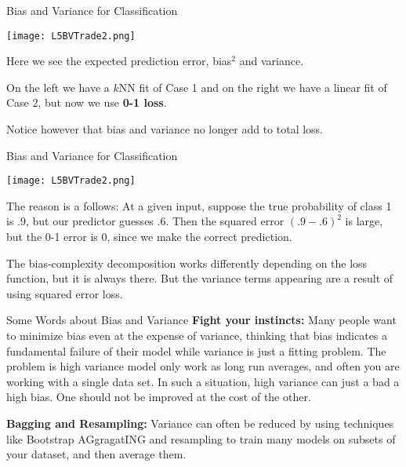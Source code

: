 \documentclass[10pt, table, dvipsnames,handout]{beamer}
\begin{document}
\begin{frame}[fragile]{Bias and Variance for Classification}
  \begin{minipage}[t][0.5\textheight][t]{\textwidth}
	  \centering \texttt{[image: L5BVTrade2.png]}
  \end{minipage}
  \vfill
  \begin{minipage}[t][0.5\textheight][t]{\textwidth}
Here we see the {\color{orange}expected prediction error}, {\color{ForestGreen}bias$^2$} and {\color{SkyBlue}variance}.\newline

On the left we have a $k$NN fit of Case 1 and on the right we have a linear fit of Case 2, but now we use \textbf{0-1 loss}. \newline

Notice however that bias and variance no longer add to total loss.  


\end{minipage}
\end{frame}



\begin{frame}[fragile]{Bias and Variance for Classification}
  \begin{minipage}[t][0.5\textheight][t]{\textwidth}
	  \centering \texttt{[image: L5BVTrade2.png]}
  \end{minipage}
  \vfill
  \begin{minipage}[t][0.5\textheight][t]{\textwidth}
The reason is a follows: At a given input, suppose the true probability of class 1 is .9, but our predictor guesses .6. Then the squared error $(.9-.6)^2$ is large, but the 0-1 error is 0, since we make the correct prediction. \pause\newline

The bias-complexity decomposition works differently depending on the loss function, but it is always there. \pause But the variance terms appearing are a result of using squared error loss. 

\end{minipage}
\end{frame}




\begin{frame}[fragile]{Some Words about Bias and Variance}
\textbf{Fight your instincts:} Many people want to minimize bias even at the expense of variance, thinking that bias indicates a fundamental failure of their model while variance is just a fitting problem. The problem is high variance model only work as long run averages, and often you are working with a single data set. In such a situation, high variance can just a bad a high bias. One should not be improved at the cost of the other. \pause

\textbf{Bagging and Resampling:} Variance can often be reduced by using techniques like Bootstrap AGgragatING and resampling to train many models on subsets of your dataset, and then average them.

\end{frame}
\end{document}
